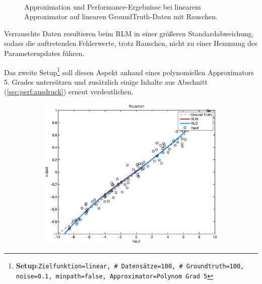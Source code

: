 \documentclass[a4paper, 12pt]{article}
\begin{document}
{\begin{figure}[H]
\begin{subfigure}[b]{0.4\textwidth}
                \caption{}
                \label{fig:perf:rauschen1:perf}
        \end{subfigure}
        \\
        \caption{Approximation und Performance-Ergebnisse bei linearem Approximator auf linearen GroundTruth-Daten mit Rauschen.}
        \label{fig:perf:rauschen1}
\end{figure}
Verrauschte Daten resultieren beim RLM in einer größeren Standardabweichung, sodass die auftretenden Fehlerwerte, trotz Rauschen, nicht zu einer Hemmung des Parameterupdates führen.

Das zweite Setup\footnote{\textbf{Setup}:\quad\texttt{Zielfunktion=linear, \# Datensätze=100, \# Groundtruth=100, noise=0.1, minpath=false, Approximator=Polynom Grad 5}} soll diesen Aspekt anhand eines polynomiellen Approximators 5. Grades untersützen und zusätzlich einige Inhalte aus Abschnitt (\ref{sec:perf:ausdruck}) erneut verdeutlichen.
\begin{figure}[H]
        \centering
        \begin{subfigure}[b]{0.4\textwidth}
                \centering
                \includegraphics[width=\textwidth]{./images/copyofstats/rauschen5_approx_100.eps}
                \caption{}
                \label{fig:perf:rauschen5:approx}
        \end{subfigure}
        \begin{subfigure}[b]{0.4\textwidth}
                \centering

\end{subfigure}
\end{figure}}
\end{document}
